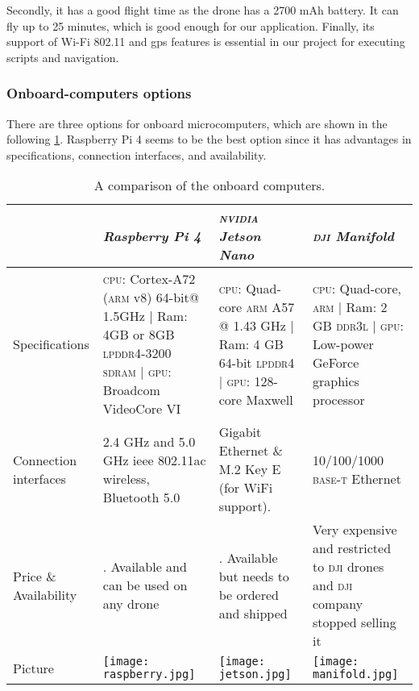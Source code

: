 \documentclass[../main.tex]{subfiles}
\begin{document}
Secondly, it has a good flight time 
as the \anafi drone has a 2700 mAh battery. 
It can fly up to 25 minutes, which is good enough 
for our application.
Finally, its support of Wi-Fi 802.11 and \gls{gps} 
features is essential in our project for 
executing scripts and navigation.

\subsubsection{Onboard-computers options}
There are three options for onboard microcomputers, 
which are shown in the following 
\cref{tab:onboard-computers}. Raspberry Pi 4 seems 
to be the best option since it has advantages 
in specifications, connection interfaces, 
and availability.

\begin{table}[H]
	\centering
	\caption{A comparison of the onboard computers.}
	\label{tab:onboard-computers}  
	\begin{tabular}{ p{3cm} p{4cm} p{4cm} p{4cm} }
		\toprule
		\textit{} & \textit{Raspberry Pi 4} & \textit{\textsc{nvidia} Jetson Nano} & 
		\textit{\textsc{dji} Manifold}\\ \midrule
		Specifications  & \textsc{cpu}: Cortex-A72 (\textsc{arm} v8) 64-bit@ 1.5GHz | Ram: 4GB or 8GB \textsc{lpddr4}-3200 \textsc{sdram} | \textsc{gpu}: Broadcom VideoCore VI & 
		\textsc{cpu}: Quad-core \textsc{arm} A57 @ 1.43 GHz | Ram: 4 GB 64-bit 
		\textsc{lpddr4}   | \textsc{gpu}: 128-core Maxwell & \textsc{cpu}: Quad-core, 
		\textsc{arm} | Ram: 2 GB \textsc{ddr3l} | \textsc{gpu}: Low-power GeForce
		 graphics processor \\ \addlinespace
		Connection interfaces & 2.4 GHz and 5.0 GHz \gls{ieee} 802.11ac wireless,
		 Bluetooth 5.0 & Gigabit Ethernet \& M.2 Key E (for WiFi support). &10/100/1000 
		 \textsc{base-t} Ethernet \\ \addlinespace
		
		Price \& Availability & \qar{300}. Available and can be used on any drone & 
		\qar{400}. Available but needs to be ordered and shipped & Very expensive 
		and restricted to \textsc{dji} drones and \textsc{dji} company stopped 
		selling it \\ \addlinespace
		Picture & \begin{minipage}{.2\textwidth}
			\texttt{[image: raspberry.jpg]}
		\end{minipage}  & \begin{minipage}{.2\textwidth}
			\texttt{[image: jetson.jpg]}
		\end{minipage} & \begin{minipage}{.2\textwidth}
			\texttt{[image: manifold.jpg]}
		\end{minipage} \\
		\bottomrule
	\end{tabular}
\end{table}
\end{document}
